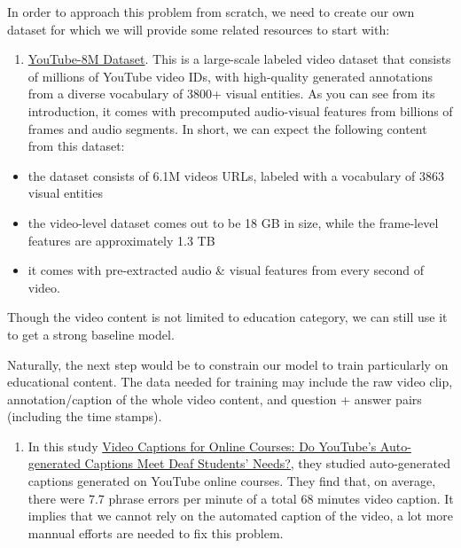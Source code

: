 \documentclass{acm_proc_article-sp}
\providecommand{\tightlist}{%
  \setlength{\itemsep}{0pt}\setlength{\parskip}{0pt}}
\begin{document}
In order to approach this problem from scratch, we need to create our
own dataset for which we will provide some related resources to start
with:

\begin{enumerate}
\def\labelenumi{\arabic{enumi}.}
\tightlist
\item
  \href{https://research.google.com/youtube8m/}{YouTube-8M Dataset}.
  This is a large-scale labeled video dataset that consists of millions
  of YouTube video IDs, with high-quality generated annotations from a
  diverse vocabulary of 3800+ visual entities. As you can see from its
  introduction, it comes with precomputed audio-visual features from
  billions of frames and audio segments. In short, we can expect the
  following content from this dataset:
\end{enumerate}

\begin{itemize}
\item
  the dataset consists of 6.1M videos URLs, labeled with a vocabulary of
  3863 visual entities
\item
  the video-level dataset comes out to be 18 GB in size, while the
  frame-level features are approximately 1.3 TB
\item
  it comes with pre-extracted audio \& visual features from every second
  of video.
\end{itemize}

Though the video content is not limited to education category, we can
still use it to get a strong baseline model.

Naturally, the next step would be to constrain our model to train
particularly on educational content. The data needed for training may
include the raw video clip, annotation/caption of the whole video
content, and question + answer pairs (including the time stamps).

\begin{enumerate}
\def\labelenumi{\arabic{enumi}.}
\setcounter{enumi}{1}
\tightlist
\item
  In this study
  \href{http://jofdl.nz/index.php/JOFDL/article/download/255/198}{Video
  Captions for Online Courses: Do YouTube's Auto-generated Captions Meet
  Deaf Students' Needs?}, they studied auto-generated captions generated
  on YouTube online courses. They find that, on average, there were 7.7
  phrase errors per minute of a total 68 minutes video caption. It
  implies that we cannot rely on the automated caption of the video, a
  lot more mannual efforts are needed to fix this problem.
\end{enumerate}
\end{document}
